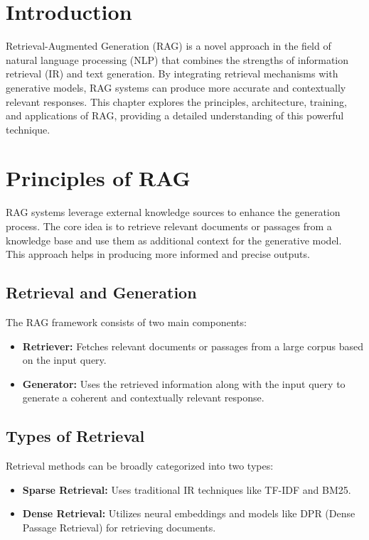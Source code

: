 \section{Introduction}
Retrieval-Augmented Generation (RAG) is a novel approach in the field of natural language processing (NLP) that combines the strengths of information retrieval (IR) and text generation. By integrating retrieval mechanisms with generative models, RAG systems can produce more accurate and contextually relevant responses. This chapter explores the principles, architecture, training, and applications of RAG, providing a detailed understanding of this powerful technique.

\section{Principles of RAG}
RAG systems leverage external knowledge sources to enhance the generation process. The core idea is to retrieve relevant documents or passages from a knowledge base and use them as additional context for the generative model. This approach helps in producing more informed and precise outputs.

\subsection{Retrieval and Generation}
The RAG framework consists of two main components:
\begin{itemize}
    \item \textbf{Retriever:} Fetches relevant documents or passages from a large corpus based on the input query.
    \item \textbf{Generator:} Uses the retrieved information along with the input query to generate a coherent and contextually relevant response.
\end{itemize}

\subsection{Types of Retrieval}
Retrieval methods can be broadly categorized into two types:
\begin{itemize}
    \item \textbf{Sparse Retrieval:} Uses traditional IR techniques like TF-IDF and BM25.
    \item \textbf{Dense Retrieval:} Utilizes neural embeddings and models like DPR (Dense Passage Retrieval) for retrieving documents.
\end{itemize}

